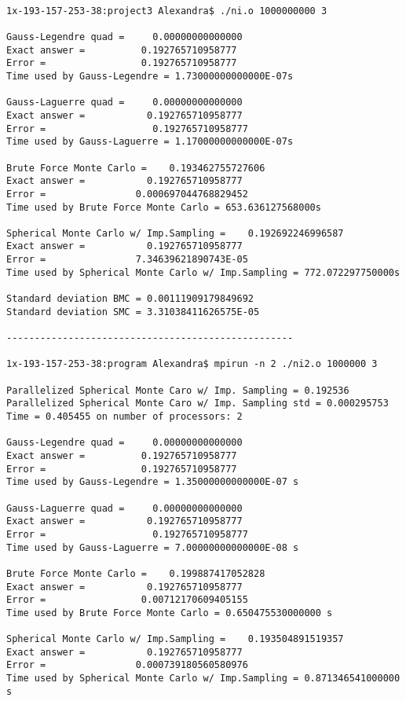 \documentclass{article}
\begin{document}
\begin{verbatim}

1x-193-157-253-38:project3 Alexandra$ ./ni.o 1000000000 3

Gauss-Legendre quad =     0.00000000000000
Exact answer =          0.192765710958777
Error =                 0.192765710958777
Time used by Gauss-Legendre = 1.73000000000000E-07s

Gauss-Laguerre quad =     0.00000000000000
Exact answer =           0.192765710958777
Error =                   0.192765710958777
Time used by Gauss-Laguerre = 1.17000000000000E-07s

Brute Force Monte Carlo =    0.193462755727606
Exact answer =           0.192765710958777
Error =                0.000697044768829452
Time used by Brute Force Monte Carlo = 653.636127568000s

Spherical Monte Carlo w/ Imp.Sampling =    0.192692246996587
Exact answer =           0.192765710958777
Error =                7.34639621890743E-05
Time used by Spherical Monte Carlo w/ Imp.Sampling = 772.072297750000s

Standard deviation BMC = 0.00111909179849692
Standard deviation SMC = 3.31038411626575E-05

---------------------------------------------------

1x-193-157-253-38:program Alexandra$ mpirun -n 2 ./ni2.o 1000000 3

Parallelized Spherical Monte Caro w/ Imp. Sampling = 0.192536
Parallelized Spherical Monte Caro w/ Imp. Sampling std = 0.000295753
Time = 0.405455 on number of processors: 2

Gauss-Legendre quad =     0.00000000000000
Exact answer =          0.192765710958777
Error =                 0.192765710958777
Time used by Gauss-Legendre = 1.35000000000000E-07 s

Gauss-Laguerre quad =     0.00000000000000
Exact answer =           0.192765710958777
Error =                   0.192765710958777
Time used by Gauss-Laguerre = 7.00000000000000E-08 s

Brute Force Monte Carlo =    0.199887417052828
Exact answer =           0.192765710958777
Error =                 0.00712170609405155
Time used by Brute Force Monte Carlo = 0.650475530000000 s

Spherical Monte Carlo w/ Imp.Sampling =    0.193504891519357
Exact answer =           0.192765710958777
Error =                0.000739180560580976
Time used by Spherical Monte Carlo w/ Imp.Sampling = 0.871346541000000 s


\end{verbatim}
\end{document}
